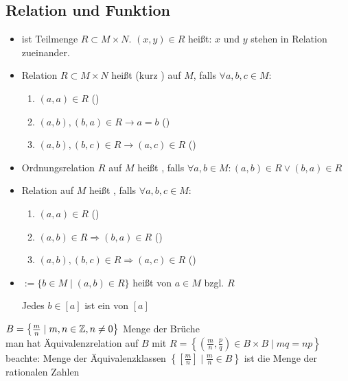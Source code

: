 \subsection{Relation und Funktion}
\begin{definition}[Relation]
	\begin{itemize}
		\item {} ist Teilmenge $R\subset M\times N$. $(x,y)\in R$ heißt: $x$ und $y$ stehen in Relation zueinander.
		\item Relation $R\subset M\times N$ heißt  (kurz ) auf $M$, falls $\forall a,b,c\in M$:
		\begin{enumerate}[label={\alph*)}]
			\item $(a,a)\in R$ ()
			\item $(a,b),(b,a)\in R \rightarrow a=b$ ()
			\item $(a,b),(b,c)\in R \rightarrow (a,c)\in R$ ()
		\end{enumerate}
		\item Ordnungsrelation $R$ auf $M$ heißt , falls $\forall a,b\in M: (a,b)\in R \lor (b,a)\in R$
		\item Relation auf $M$ heißt , falls $\forall a,b,c\in M$:
		\begin{enumerate}[label={\alph*)}]
			\item $(a,a)\in R$ ()
			\item $(a,b)\in R \Rightarrow (b,a)\in R$ ()
			\item $(a,b),(b,c)\in R \Rightarrow (a,c)\in R$ ()
		\end{enumerate}
		\item \mathsymbol{[a]}{$[a]$}$:=\{b\in M\mid (a,b)\in R\}$ heißt  von $a\in M$ bzgl. $R$
		
		Jedes $b\in [a]$ ist ein  von $[a]$
	\end{itemize}
\end{definition}

\begin{example}
	$B=\left\lbrace \frac{m}{n}\mid m,n\in\mathbb{Z},n\neq 0 \right\rbrace$ Menge der Brüche \\
	man hat Äquivalenzrelation auf $B$ mit $R=\left\lbrace\left( \frac{m}{n},\frac{p}{q}\right)\in B\times B \mid mq=np\right\rbrace$ \\
	beachte: Menge der Äquivalenzklassen $\left\lbrace\left[ \frac{m}{n}\right]\mid \frac{m}{n}\in B \right\rbrace$ ist die Menge der rationalen Zahlen
\end{example}


